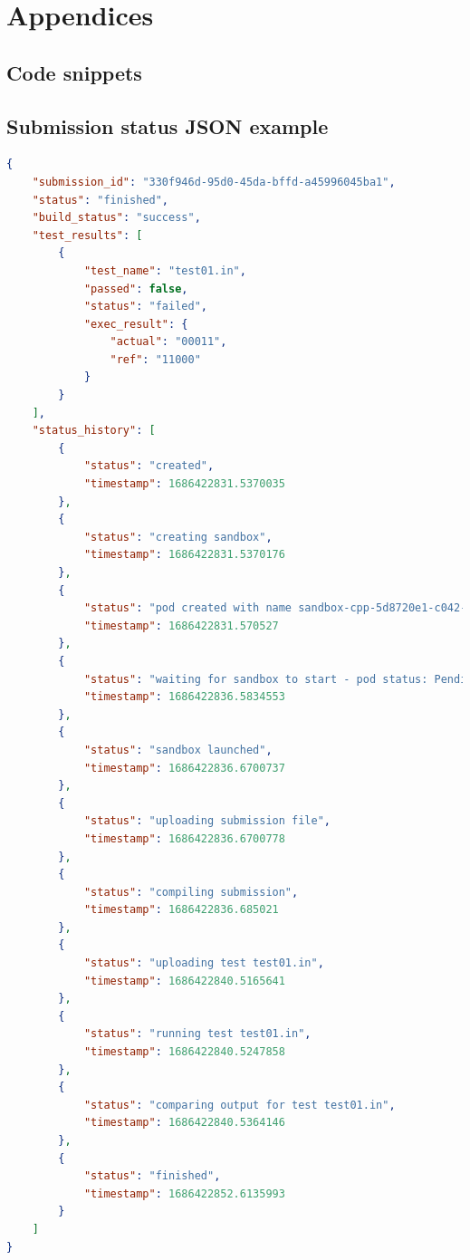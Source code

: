 \documentclass[12pt,a4paper]{report}
\begin{document}


\chapter*{Appendices}
\begin{appendices}

\chapter{Code snippets}
\label{anexa:cod}
\section{Submission status JSON example}
\label{anexa:cod:json-submission}
\begin{lstlisting}[language=json,firstnumber=1]
{
	"submission_id": "330f946d-95d0-45da-bffd-a45996045ba1",
	"status": "finished",
	"build_status": "success",
	"test_results": [
		{
			"test_name": "test01.in",
			"passed": false,
			"status": "failed",
			"exec_result": {
				"actual": "00011",
				"ref": "11000"
			}
		}
	],
	"status_history": [
		{
			"status": "created",
			"timestamp": 1686422831.5370035
		},
		{
			"status": "creating sandbox",
			"timestamp": 1686422831.5370176
		},
		{
			"status": "pod created with name sandbox-cpp-5d8720e1-c042-43ea-a95a-e8e268c6f0be",
			"timestamp": 1686422831.570527
		},
		{
			"status": "waiting for sandbox to start - pod status: Pending",
			"timestamp": 1686422836.5834553
		},
		{
			"status": "sandbox launched",
			"timestamp": 1686422836.6700737
		},
		{
			"status": "uploading submission file",
			"timestamp": 1686422836.6700778
		},
		{
			"status": "compiling submission",
			"timestamp": 1686422836.685021
		},
		{
			"status": "uploading test test01.in",
			"timestamp": 1686422840.5165641
		},
		{
			"status": "running test test01.in",
			"timestamp": 1686422840.5247858
		},
		{
			"status": "comparing output for test test01.in",
			"timestamp": 1686422840.5364146
		},
		{
			"status": "finished",
			"timestamp": 1686422852.6135993
		}
	]
}
\end{lstlisting}


\end{appendices}
\end{document}
